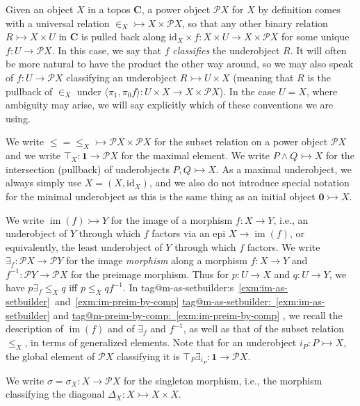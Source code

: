 \documentclass{amsart}
\makeatletter
\newcommand\bC{\mathbf{C}}
\newcommand\br[1]{\langle{}#1\rangle{}}
\newcommand\id{\mathrm{id}}
\newcommand\im{\operatorname{im}}
\newcommand\I{^{-1}}
\newcommand\pow{\mathcal{P}}
\newcommand\tm{\mathbf{1}}
\newcommand\tto{\rightarrowtail}
\newcommand\unin{{\in}}
\newcommand\zset{\mathbf{0}}
\newcommand\tagword[1]{\csname tag@#1\endcsname}
\def\label@tag#1:#2\@nil{#1}
\newcommand\labeltag[1]{\label@tag#1:\@nil}
\newcommand\jref[1]{%
  \texorpdfstring%
    {\hyperref[#1]{\tagword{\labeltag{#1}}~\ref*{#1}}}%
    {\tagword{\labeltag{#1}}~\ref*{#1}}%
}
\newcommand\jrefs[2]{%
  \ifthenelse{\equal{\labeltag{#1}}{\labeltag{#2}}}%
  {%
    \texorpdfstring%
      {\tagword{\labeltag{#1}}s~\ref{#1}~and~\ref{#2}}%
      {\tagword{\labeltag{#1}}s~\ref*{#1}~and~\ref*{#2}}%
  }{\jref{#1} and \jref{#2}}%
}
\theoremstyle{definition}
\theoremstyle{remark}
\theoremstyle{plainwithref}
\makeatother
\begin{document}
Given an object \( X \) in a topos \( \bC \), a power object \( \pow X \) for \( X \) by definition comes with a universal relation \( \unin_X \tto X \times \pow X \), so that any other binary relation \( R \tto X \times U \) in \( \bC \) is pulled back along \( \id_X \times f \colon X \times U \to X \times \pow X \) for some unique \( f \colon U \to \pow X \).
In this case, we say that \( f \) \emph{classifies} the underobject \( R \).
It will often be more natural to have the product the other way around, so we may also speak of \( f \colon U \to \pow X \) classifying an underobject \( R \tto U \times X \) (meaning that \( R \) is the pullback of \( \unin_X \) under \( \br{\pi_1, \pi_0 f} \colon U \times X \to X \times \pow X \)).
In the case \( U = X \), where ambiguity may arise, we will say explicitly which of these conventions we are using.

We write \( {\le} = {\le_X} \tto \pow X \times \pow X \) for the subset relation on a power object \( \pow X \) and we write \( \top_X \colon \tm \to \pow X \) for the maximal element.
We write \( P \wedge Q \tto X \) for the intersection (pullback) of underobjects \( P, Q \tto X \).
As a maximal underobject, we always simply use \( X = (X, \id_X ) \), and we also do not introduce special notation for the minimal underobject as this is the same thing as an initial object \( \zset \tto X \).

We write \( \im(f) \tto Y \) for the image of a morphism \( f \colon X \to Y \), i.e., an underobject of \( Y \) through which \( f \) factors via an epi \( X \to \im(f) \), or equivalently, the least underobject of \( Y \) through which \( f \) factors.
We write \( \exists_f \colon \pow X \to \pow Y \) for the image \emph{morphism} along a morphism \( f \colon X \to Y \) and \( f\I \colon \pow Y \to \pow X \) for the preimage morphism.
Thus for \( p \colon U \to X \) and \( q \colon U \to Y \), we have \( p \exists_f \le_X q \) iff \( p \le_X q f\I \).
In \jrefs{exm:im-as-setbuilder}{exm:im-preim-by-comp}, we recall the description of \( \im(f) \) and of \( \exists_f \) and \( f\I \), as well as that of the subset relation \( {\le_X} \), in terms of generalized elements.
Note that for an underobject \( i_P \colon P \tto X \), the global element of \( \pow X \) classifying it is \( \top_P \exists_{i_P} \colon \tm \to \pow X \).

We write \( \sigma = \sigma_X \colon X \to \pow X \) for the singleton morphism, i.e., the morphism classifying the diagonal \( \Delta_X \colon X \tto X \times X \).
\end{document}
